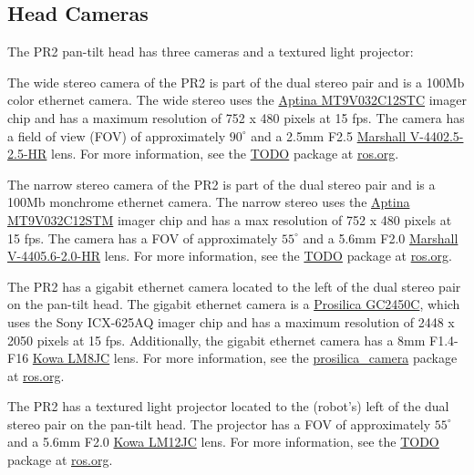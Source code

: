 \subsection{Head Cameras}
The PR2 pan-tilt head has three cameras and a textured light projector:
\begin{description}
\label{stereo camera}
\item[Wide Stereo Camera]
The wide stereo camera of the PR2 is part of the dual stereo pair and is a 100Mb color ethernet camera. The wide stereo 
uses the \href{http://www.aptina.com/products/image_sensors/mt9v032c12stc/#overview}{Aptina MT9V032C12STC} imager chip
and has a maximum resolution of 752 x 480 pixels at 15 fps. The camera has a field of view (FOV) of approximately 
$90^\circ$ and a 2.5mm F2.5 \href{http://www.mars-cam.com/lenses/ccd_cmos/Technology%20Report(V-4402.5-2.5-HR).pdf}{Marshall V-4402.5-2.5-HR} 
lens. For more information, see the \href{http://www.ros.org/wiki/wge100_camera}{TODO} package
at \href{http://www.ros.org}{ros.org}.

\item[Narrow Stereo Camera]
The narrow stereo camera of the PR2 is part of the dual stereo pair and is a 100Mb monchrome ethernet camera. 
The narrow stereo uses the \href{http://www.aptina.com/products/image_sensors/mt9v032c12stm/#overview}{Aptina MT9V032C12STM} 
imager chip and has a max resolution of 752 x 480 pixels at 15 fps. The camera has a FOV of approximately $55^\circ$ and 
a 5.6mm F2.0  \href{http://www.mars-cam.com/lenses/ccd_cmos/Technology%20Report(V-4405.6-2.0-HR).pdf}{Marshall V-4405.6-2.0-HR}
lens. For more information, see the \href{http://www.ros.org/wiki/wge100_camera}{TODO} package
at \href{http://www.ros.org}{ros.org}.

\item[Gigabit Ethernet Camera]
\label{ethernet camera}
The PR2 has a gigabit ethernet camera located to the left of the dual stereo pair on the pan-tilt head. 
The gigabit ethernet camera is a \href{http://www.prosilica.com/products/gc2450.html}{Prosilica GC2450C},  
which uses the Sony ICX-625AQ imager chip and has a maximum resolution of 2448 x 2050 pixels at 15 fps. 
Additionally, the gigabit ethernet camera has a 8mm F1.4-F16 \href{http://www.kowascope.com/frontend/proddetail.asp?pn=LM8JC&co=10000348}{Kowa LM8JC} 
lens. For more information, see the \href{http://www.ros.org/wiki/prosilica_camera}{prosilica\_camera} 
package at \href{http://www.ros.org}{ros.org}.

\item[Textured Light Projector]
\label{texture projector}
The PR2 has a textured light projector located to the (robot's) left of the dual stereo pair on the pan-tilt head. 
The projector has a FOV of approximately $55^\circ$ and a 5.6mm F2.0 \href{http://www.kowascope.com/frontend/proddetail.asp?pn=LM12JC&co=10000348}{Kowa LM12JC} 
lens.  For more information, see the \href{http://www.ros.org/wiki/TODO}{TODO} package at \href{http://www.ros.org}{ros.org}.

\end{description}

